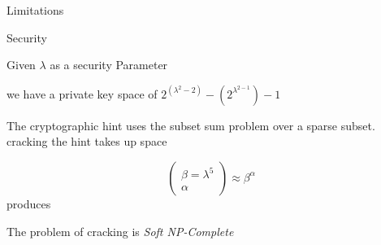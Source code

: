 \documentclass[a0,portrait]{a0poster}
\begin{document}
\begin{multicols}{2}
\begin{slide}{Limitations}

\end{slide}

\begin{slide}{Security}

Given \(\lambda\) as a security Parameter 

we have a private key space of \(2^{(\lambda^2-2)} - (2^{\lambda^{2-1}})-1\)

The cryptographic hint uses the subset sum problem over a sparse subset. cracking the hint takes up space 

\[\left(\begin{matrix}\beta = \lambda^5\\\alpha \end{matrix}\right)\approx \beta^\alpha\] produces


The problem of cracking is {\em Soft NP-Complete}

\end{slide}




\end{multicols}
\end{document}
